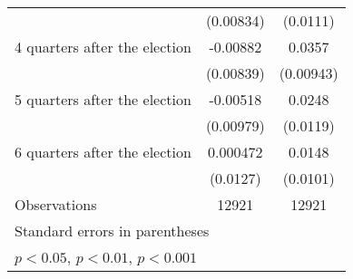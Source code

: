 \begin{table}[htbp]
\begin{tabular}{l*{2}{c}}
                    &   (0.00834)         &    (0.0111)         \\
[1em]
 4 quarters after the election&    -0.00882         &      0.0357\sym{***}\\
                    &   (0.00839)         &   (0.00943)         \\
[1em]
 5 quarters after the election&    -0.00518         &      0.0248\sym{*}  \\
                    &   (0.00979)         &    (0.0119)         \\
[1em]
 6 quarters after the election&    0.000472         &      0.0148         \\
                    &    (0.0127)         &    (0.0101)         \\
\hline
Observations        &       12921         &       12921         \\
\hline\hline
\multicolumn{3}{l}{\footnotesize Standard errors in parentheses}\\
\multicolumn{3}{l}{\footnotesize \sym{*} \(p<0.05\), \sym{**} \(p<0.01\), \sym{***} \(p<0.001\)}\\
\end{tabular}
\end{table}
